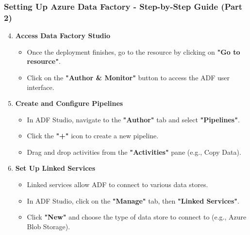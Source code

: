\documentclass[aspectratio=169]{beamer}
\begin{document}
\begin{frame}[fragile]
    \frametitle{Setting Up Azure Data Factory - Step-by-Step Guide (Part 2)}
    \begin{enumerate}
        \setcounter{enumi}{3} %
        \item \textbf{Access Data Factory Studio}
            \begin{itemize}
                \item Once the deployment finishes, go to the resource by clicking on \textbf{"Go to resource"}.
                \item Click on the \textbf{"Author \& Monitor"} button to access the ADF user interface.
            \end{itemize}
        
        \item \textbf{Create and Configure Pipelines}
            \begin{itemize}
                \item In ADF Studio, navigate to the \textbf{"Author"} tab and select \textbf{"Pipelines"}.
                \item Click the \textbf{"+"} icon to create a new pipeline.
                \item Drag and drop activities from the \textbf{"Activities"} pane (e.g., Copy Data).
            \end{itemize}
        
        \item \textbf{Set Up Linked Services}
            \begin{itemize}
                \item Linked services allow ADF to connect to various data stores.
                \item In ADF Studio, click on the \textbf{"Manage"} tab, then \textbf{"Linked Services"}.
                \item Click \textbf{"New"} and choose the type of data store to connect to (e.g., Azure Blob Storage).
            \end{itemize}
    \end{enumerate}
\end{frame}
\end{document}

